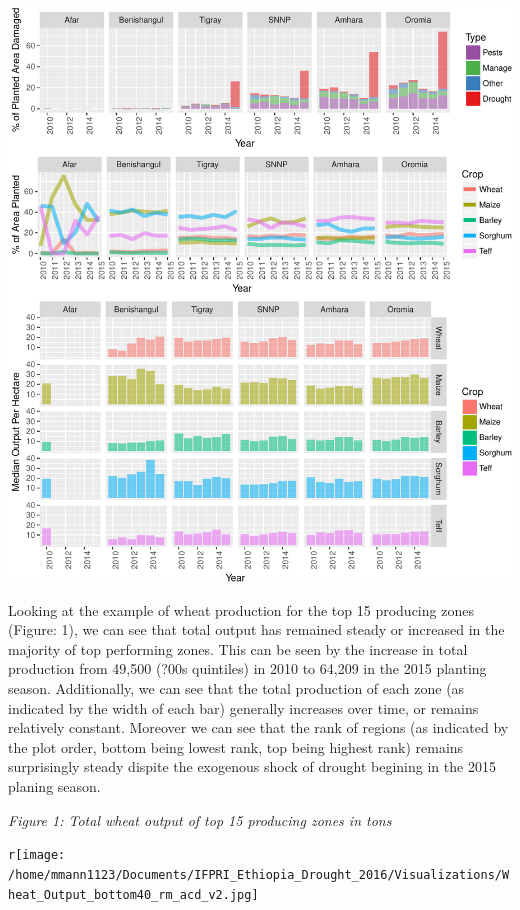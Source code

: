\documentclass[]{elsarticle} %
\makeatletter
\def\maxwidth{\ifdim\Gin@nat@width>\linewidth\linewidth
\else\Gin@nat@width\fi}
\let\Oldincludegraphics\includegraphics
\renewcommand{\includegraphics}[1]{\Oldincludegraphics[width=\maxwidth]{#1}}
\makeatother
\begin{document}
\includegraphics{IFPRI_2016_Report_Ethiopia_files/figure-latex/unnamed-chunk-2-1.pdf}

Looking at the example of wheat production for the top 15 producing
zones (Figure: 1), we can see that total output has remained steady or
increased in the majority of top performing zones. This can be seen by
the increase in total production from 49,500 (?00s quintiles) in 2010 to
64,209 in the 2015 planting season. Additionally, we can see that the
total production of each zone (as indicated by the width of each bar)
generally increases over time, or remains relatively constant. Moreover
we can see that the rank of regions (as indicated by the plot order,
bottom being lowest rank, top being highest rank) remains surprisingly
steady dispite the exogenous shock of drought begining in the 2015
planing season.

\newpage

\emph{Figure 1: Total wheat output of top 15 producing zones in tons}

\texttt{r}\texttt{[image: /home/mmann1123/Documents/IFPRI\_Ethiopia\_Drought\_2016/Visualizations/Wheat\_Output\_bottom40\_rm\_acd\_v2.jpg]}
\end{document}
